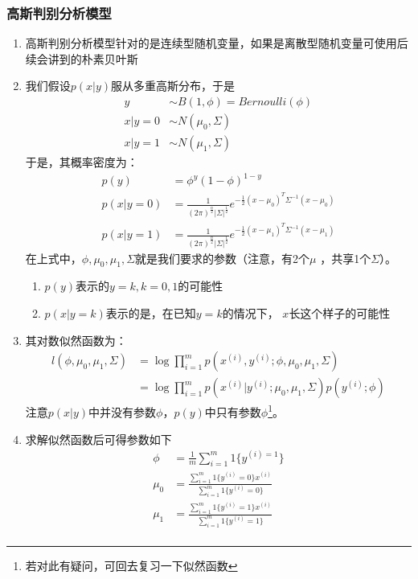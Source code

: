 \subsubsection{高斯判别分析模型}
\begin{enumerate}
	\item 高斯判别分析模型针对的是连续型随机变量，如果是离散型随机变量可使用后续会讲到的朴素贝叶斯
	\item 我们假设$p(x|y)$服从多重高斯分布，于是
	\begin{align}
		y & \sim B(1, \phi) = Bernoulli(\phi) \\
		x|y=0 &\sim N(\mu_0, \Sigma) \\
		x|y=1 &\sim N(\mu_1, \Sigma)
	\end{align}
	于是，其概率密度为：
	\begin{align}
		p(y) &= \phi^y(1-\phi)^{1-y} \\
		p(x|y=0) &= \frac{1}{(2\pi)^{\frac{n}{2}}|\Sigma|^\frac{1}{2}}e^{-\frac{1}{2}(x-\mu_0)^T\Sigma^{-1}(x-\mu_0)} \\
		p(x|y=1) &= \frac{1}{(2\pi)^{\frac{n}{2}}|\Sigma|^\frac{1}{2}}e^{-\frac{1}{2}(x-\mu_1)^T\Sigma^{-1}(x-\mu_1)}
	\end{align}
	在上式中，$\phi, \mu_0, \mu_1, \Sigma$就是我们要求的参数（注意，有2个$\mu$
	，共享1个$\Sigma$）。
	\begin{enumerate}
		\item $p(y)$表示的$y=k, k=0,1$的可能性
		\item $p(x|y=k)$表示的是，在已知$y=k$的情况下， $x$长这个样子的可能性
	\end{enumerate}
	\item 其对数似然函数为：
	\begin{align}
		l(\phi, \mu_0, \mu_1, \Sigma) &= \log \prod_{i=1}^{m} p\left(x^{(i)}, y^{(i)}; \phi, \mu_0, \mu_1, \Sigma\right) \\
		&= \log \prod_{i=1}^{m} p\left(x^{(i)}|y^{(i)}; \mu_0, \mu_1, \Sigma\right)p\left(y^{(i)};\phi\right)
	\end{align}
	注意$p(x|y)$中并没有参数$\phi$，$p(y)$中只有参数$\phi$\footnote{若对此有疑问，可回去复习一下似然函数}。
	\item 求解似然函数后可得参数如下
	\begin{align}
		\phi &= \frac{1}{m} \sum_{i=1}^{m}1\{y^{(i)=1}\} \\
		\mu_0 &= \frac{\sum_{i=1}^{m}1\{y^{(i)}=0\}x^{(i)}}{\sum_{i=1}^{m}1\{y^{(i)}=0\}} \\
		\mu_1 &= \frac{\sum_{i=1}^{m}1\{y^{(i)}=1\}x^{(i)}}{\sum_{i=1}^{m}1\{y^{(i)}=1\}} \\

\end{align}
\end{enumerate}
